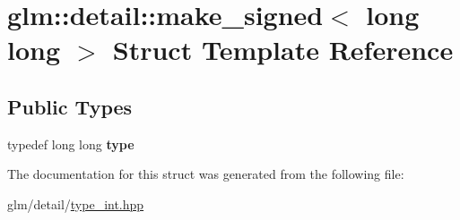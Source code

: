 \hypertarget{structglm_1_1detail_1_1make__signed_3_01long_01long_01_4}{\section{glm\-:\-:detail\-:\-:make\-\_\-signed$<$ long long $>$ Struct Template Reference}
\label{structglm_1_1detail_1_1make__signed_3_01long_01long_01_4}
}
\subsection*{Public Types}
\begin{DoxyCompactItemize}
\item 
\hypertarget{structglm_1_1detail_1_1make__signed_3_01long_01long_01_4_a109303fc9f5838a2843711c023a57bc8}{typedef long long {\bfseries type}}\label{structglm_1_1detail_1_1make__signed_3_01long_01long_01_4_a109303fc9f5838a2843711c023a57bc8}

\end{DoxyCompactItemize}


The documentation for this struct was generated from the following file\-:\begin{DoxyCompactItemize}
\item 
glm/detail/\hyperlink{type__int_8hpp}{type\-\_\-int.\-hpp}\end{DoxyCompactItemize}
